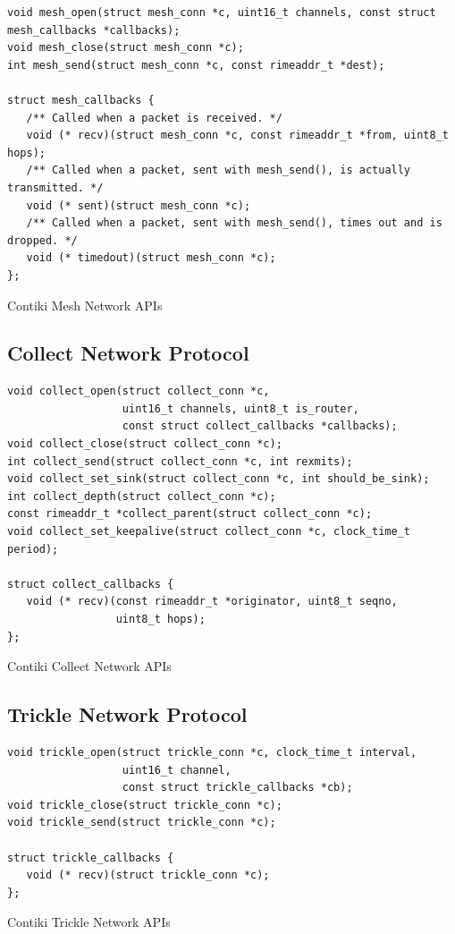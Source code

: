 \begin{listing}[H]
\begin{verbatim}
void mesh_open(struct mesh_conn *c, uint16_t channels, const struct mesh_callbacks *callbacks);
void mesh_close(struct mesh_conn *c);
int mesh_send(struct mesh_conn *c, const rimeaddr_t *dest);

struct mesh_callbacks {
   /** Called when a packet is received. */
   void (* recv)(struct mesh_conn *c, const rimeaddr_t *from, uint8_t hops);
   /** Called when a packet, sent with mesh_send(), is actually transmitted. */
   void (* sent)(struct mesh_conn *c);
   /** Called when a packet, sent with mesh_send(), times out and is dropped. */
   void (* timedout)(struct mesh_conn *c);
};
\end{verbatim}
\caption{Contiki Mesh Network APIs}
\end{listing}


\subsection{Collect Network Protocol}

\begin{listing}[H]
\begin{verbatim}
void collect_open(struct collect_conn *c,
                  uint16_t channels, uint8_t is_router,
                  const struct collect_callbacks *callbacks);
void collect_close(struct collect_conn *c);
int collect_send(struct collect_conn *c, int rexmits);
void collect_set_sink(struct collect_conn *c, int should_be_sink);
int collect_depth(struct collect_conn *c);
const rimeaddr_t *collect_parent(struct collect_conn *c);
void collect_set_keepalive(struct collect_conn *c, clock_time_t period);

struct collect_callbacks {
   void (* recv)(const rimeaddr_t *originator, uint8_t seqno,
                 uint8_t hops);
};
\end{verbatim}
\caption{Contiki Collect Network APIs}
\end{listing}


\subsection{Trickle Network Protocol}

\begin{listing}[H]
\begin{verbatim}
void trickle_open(struct trickle_conn *c, clock_time_t interval,
                  uint16_t channel,
                  const struct trickle_callbacks *cb);
void trickle_close(struct trickle_conn *c);
void trickle_send(struct trickle_conn *c);

struct trickle_callbacks {
   void (* recv)(struct trickle_conn *c);
};
\end{verbatim}
\caption{Contiki Trickle Network APIs}
\end{listing}


